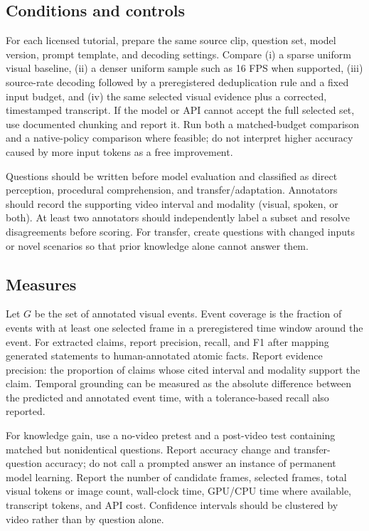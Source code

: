\documentclass[11pt]{article}
\begin{document}
\subsection{Conditions and controls}
For each licensed tutorial, prepare the same source clip, question set, model version, prompt template, and decoding settings. Compare (i) a sparse uniform visual baseline, (ii) a denser uniform sample such as 16 FPS when supported, (iii) source-rate decoding followed by a preregistered deduplication rule and a fixed input budget, and (iv) the same selected visual evidence plus a corrected, timestamped transcript. If the model or API cannot accept the full selected set, use documented chunking and report it. Run both a matched-budget comparison and a native-policy comparison where feasible; do not interpret higher accuracy caused by more input tokens as a free improvement.

Questions should be written before model evaluation and classified as direct perception, procedural comprehension, and transfer/adaptation. Annotators should record the supporting video interval and modality (visual, spoken, or both). At least two annotators should independently label a subset and resolve disagreements before scoring. For transfer, create questions with changed inputs or novel scenarios so that prior knowledge alone cannot answer them.

\subsection{Measures}
Let $G$ be the set of annotated visual events. Event coverage is the fraction of events with at least one selected frame in a preregistered time window around the event. For extracted claims, report precision, recall, and F1 after mapping generated statements to human-annotated atomic facts. Report evidence precision: the proportion of claims whose cited interval and modality support the claim. Temporal grounding can be measured as the absolute difference between the predicted and annotated event time, with a tolerance-based recall also reported.

For knowledge gain, use a no-video pretest and a post-video test containing matched but nonidentical questions. Report accuracy change and transfer-question accuracy; do not call a prompted answer an instance of permanent model learning. Report the number of candidate frames, selected frames, total visual tokens or image count, wall-clock time, GPU/CPU time where available, transcript tokens, and API cost. Confidence intervals should be clustered by video rather than by question alone.
\end{document}
